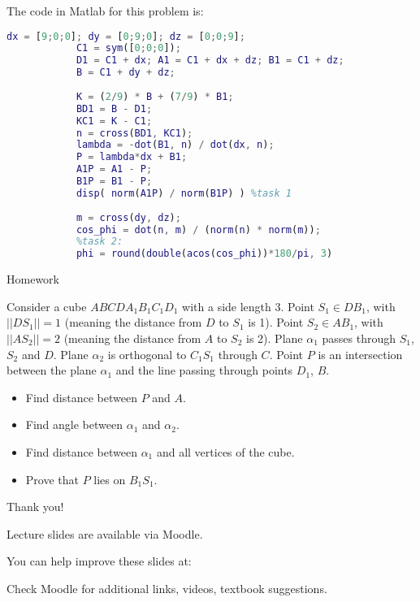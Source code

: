 \documentclass{beamer}
\begin{document}
\begin{frame}[fragile]{The code in Matlab for this problem is:}
	\begin{flushleft}
		
		\begin{lstlisting}[language=Matlab]
			dx = [9;0;0]; dy = [0;9;0]; dz = [0;0;9];
			C1 = sym([0;0;0]);
			D1 = C1 + dx; A1 = C1 + dx + dz; B1 = C1 + dz;
			B = C1 + dy + dz;
			
			K = (2/9) * B + (7/9) * B1;
			BD1 = B - D1;
			KC1 = K - C1;
			n = cross(BD1, KC1);
			lambda = -dot(B1, n) / dot(dx, n);
			P = lambda*dx + B1;
			A1P = A1 - P;
			B1P = B1 - P;
			disp( norm(A1P) / norm(B1P) ) %task 1
			
			m = cross(dy, dz); 
			cos_phi = dot(n, m) / (norm(n) * norm(m));
			%task 2:
			phi = round(double(acos(cos_phi))*180/pi, 3) 
		\end{lstlisting}
		
		
	\end{flushleft}
\end{frame}


\begin{frame}{Homework}
	\begin{flushleft}
		
		Consider a cube $ABCD A_1 B_1 C_1 D_1$ with a side length 3. Point $S_1 \in DB_1$, with $||DS_1|| = 1$ (meaning the distance from $D$ to $S_1$ is 1). Point $S_2 \in AB_1$, with $||AS_2|| = 2$ (meaning the distance from $A$ to $S_2$ is 2). Plane $\alpha_1$ passes through $S_1$, $S_2$ and $D$. Plane $\alpha_2$ is orthogonal to $C_1S_1$ through $C$. Point $P$ is an intersection between the plane $\alpha_1$ and the line passing through points $D_1$, $B$.
		
		\bigskip
		
		\begin{itemize}
			\item Find distance between $P$ and $A$.
			\item Find angle between $\alpha_1$ and $\alpha_2$.
			\item Find distance between $\alpha_1$ and all vertices of the cube.
			\item Prove that $P$ lies on $B_1 S_1$.
		\end{itemize}
		
		
	\end{flushleft}
\end{frame}




\begin{frame}{Thank you!}
\centerline{Lecture slides are available via Moodle.}
\bigskip
\centerline{You can help improve these slides at:}
\centerline{\mygit}
\bigskip
\centerline{Check Moodle for additional links, videos, textbook suggestions.}
\bigskip

\centerline{\textcolor{black}{}}

\end{frame}
\end{document}
